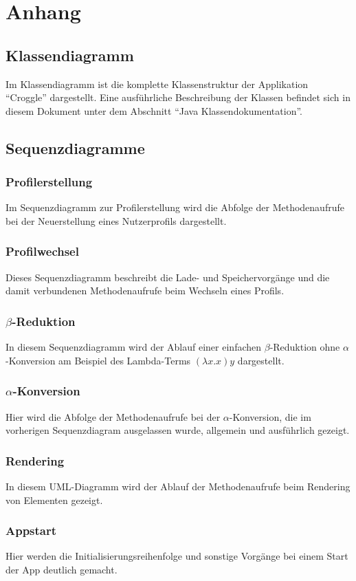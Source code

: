 \chapter{Anhang}
\section{Klassendiagramm}
	Im Klassendiagramm ist die komplette Klassenstruktur der Applikation "`Croggle"' dargestellt. 
	Eine ausführliche Beschreibung der Klassen befindet sich in diesem Dokument unter dem Abschnitt "`Java Klassendokumentation"'. 

\section{Sequenzdiagramme}
	\subsection{Profilerstellung}
		Im Sequenzdiagramm zur Profilerstellung wird die Abfolge der Methodenaufrufe bei der Neuerstellung eines Nutzerprofils dargestellt.

	\subsection{Profilwechsel}
		Dieses Sequenzdiagramm beschreibt die Lade- und Speichervorgänge und die damit verbundenen Methodenaufrufe beim Wechseln eines Profils. 

	\subsection{\(\beta\)-Reduktion}
		In diesem Sequenzdiagramm wird der Ablauf einer einfachen \(\beta\)-Reduktion ohne \(\alpha\)-Konversion am Beispiel des Lambda-Terms \((\lambda x.x) y\) dargestellt.

	\subsection{\(\alpha\)-Konversion}
		Hier wird die Abfolge der Methodenaufrufe bei der \(\alpha\)-Konversion, die im vorherigen Sequenzdiagram ausgelassen wurde, allgemein und ausführlich gezeigt.  

	\subsection{Rendering}
		In diesem UML-Diagramm wird der Ablauf der Methodenaufrufe beim Rendering von Elementen gezeigt.

	\subsection{Appstart}
		Hier werden die Initialisierungsreihenfolge und sonstige Vorgänge bei einem Start der App deutlich gemacht.

